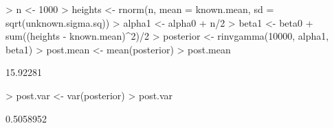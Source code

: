 \documentclass[handout]{beamer}
\begin{document}
\begin{frame}[fragile]
\tiny
\begin{Schunk}
\begin{Sinput}
> n <- 1000
> heights <- rnorm(n, mean = known.mean, sd = sqrt(unknown.sigma.sq))
> alpha1 <- alpha0 + n/2
> beta1 <- beta0 + sum((heights - known.mean)^2)/2
> posterior <- rinvgamma(10000, alpha1, beta1)
> post.mean <- mean(posterior)
> post.mean
\end{Sinput}
\begin{Soutput}
[1] 15.92281
\end{Soutput}
\begin{Sinput}
> post.var <- var(posterior)
> post.var
\end{Sinput}
\begin{Soutput}
[1] 0.5058952
\end{Soutput}
\end{Schunk}
\end{frame}
\end{document}
